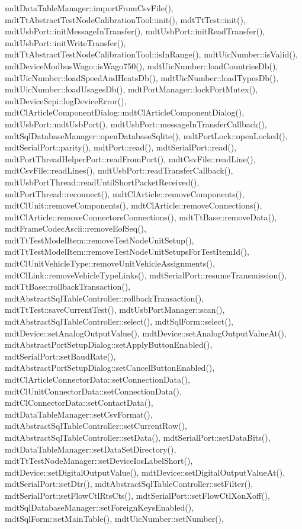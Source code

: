 mdt\-Data\-Table\-Manager\-::import\-From\-Csv\-File(), mdt\-Tt\-Abstract\-Test\-Node\-Calibration\-Tool\-::init(), mdt\-Tt\-Test\-::init(), mdt\-Usb\-Port\-::init\-Message\-In\-Transfer(), mdt\-Usb\-Port\-::init\-Read\-Transfer(), mdt\-Usb\-Port\-::init\-Write\-Transfer(), mdt\-Tt\-Abstract\-Test\-Node\-Calibration\-Tool\-::is\-In\-Range(), mdt\-Uic\-Number\-::is\-Valid(), mdt\-Device\-Modbus\-Wago\-::is\-Wago750(), mdt\-Uic\-Number\-::load\-Countries\-Db(), mdt\-Uic\-Number\-::load\-Speed\-And\-Heats\-Db(), mdt\-Uic\-Number\-::load\-Types\-Db(), mdt\-Uic\-Number\-::load\-Usages\-Db(), mdt\-Port\-Manager\-::lock\-Port\-Mutex(), mdt\-Device\-Scpi\-::log\-Device\-Error(), mdt\-Cl\-Article\-Component\-Dialog\-::mdt\-Cl\-Article\-Component\-Dialog(), mdt\-Usb\-Port\-::mdt\-Usb\-Port(), mdt\-Usb\-Port\-::message\-In\-Transfer\-Callback(), mdt\-Sql\-Database\-Manager\-::open\-Database\-Sqlite(), mdt\-Port\-Lock\-::open\-Locked(), mdt\-Serial\-Port\-::parity(), mdt\-Port\-::read(), mdt\-Serial\-Port\-::read(), mdt\-Port\-Thread\-Helper\-Port\-::read\-From\-Port(), mdt\-Csv\-File\-::read\-Line(), mdt\-Csv\-File\-::read\-Lines(), mdt\-Usb\-Port\-::read\-Transfer\-Callback(), mdt\-Usb\-Port\-Thread\-::read\-Until\-Short\-Packet\-Received(), mdt\-Port\-Thread\-::reconnect(), mdt\-Cl\-Article\-::remove\-Components(), mdt\-Cl\-Unit\-::remove\-Components(), mdt\-Cl\-Article\-::remove\-Connections(), mdt\-Cl\-Article\-::remove\-Connectors\-Connections(), mdt\-Tt\-Base\-::remove\-Data(), mdt\-Frame\-Codec\-Ascii\-::remove\-Eof\-Seq(), mdt\-Tt\-Test\-Model\-Item\-::remove\-Test\-Node\-Unit\-Setup(), mdt\-Tt\-Test\-Model\-Item\-::remove\-Test\-Node\-Unit\-Setups\-For\-Test\-Item\-Id(), mdt\-Cl\-Unit\-Vehicle\-Type\-::remove\-Unit\-Vehicle\-Assignments(), mdt\-Cl\-Link\-::remove\-Vehicle\-Type\-Links(), mdt\-Serial\-Port\-::resume\-Transmission(), mdt\-Tt\-Base\-::rollback\-Transaction(), mdt\-Abstract\-Sql\-Table\-Controller\-::rollback\-Transaction(), mdt\-Tt\-Test\-::save\-Current\-Test(), mdt\-Usb\-Port\-Manager\-::scan(), mdt\-Abstract\-Sql\-Table\-Controller\-::select(), mdt\-Sql\-Form\-::select(), mdt\-Device\-::set\-Analog\-Output\-Value(), mdt\-Device\-::set\-Analog\-Output\-Value\-At(), mdt\-Abstract\-Port\-Setup\-Dialog\-::set\-Apply\-Button\-Enabled(), mdt\-Serial\-Port\-::set\-Baud\-Rate(), mdt\-Abstract\-Port\-Setup\-Dialog\-::set\-Cancel\-Button\-Enabled(), mdt\-Cl\-Article\-Connector\-Data\-::set\-Connection\-Data(), mdt\-Cl\-Unit\-Connector\-Data\-::set\-Connection\-Data(), mdt\-Cl\-Connector\-Data\-::set\-Contact\-Data(), mdt\-Data\-Table\-Manager\-::set\-Csv\-Format(), mdt\-Abstract\-Sql\-Table\-Controller\-::set\-Current\-Row(), mdt\-Abstract\-Sql\-Table\-Controller\-::set\-Data(), mdt\-Serial\-Port\-::set\-Data\-Bits(), mdt\-Data\-Table\-Manager\-::set\-Data\-Set\-Directory(), mdt\-Tt\-Test\-Node\-Manager\-::set\-Device\-Ios\-Label\-Short(), mdt\-Device\-::set\-Digital\-Output\-Value(), mdt\-Device\-::set\-Digital\-Output\-Value\-At(), mdt\-Serial\-Port\-::set\-Dtr(), mdt\-Abstract\-Sql\-Table\-Controller\-::set\-Filter(), mdt\-Serial\-Port\-::set\-Flow\-Ctl\-Rts\-Cts(), mdt\-Serial\-Port\-::set\-Flow\-Ctl\-Xon\-Xoff(), mdt\-Sql\-Database\-Manager\-::set\-Foreign\-Keys\-Enabled(), mdt\-Sql\-Form\-::set\-Main\-Table(), mdt\-Uic\-Number\-::set\-Number(), 